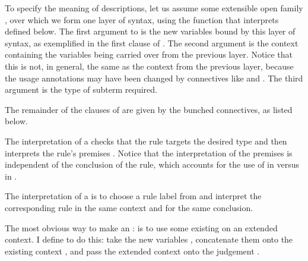 To specify the meaning of descriptions, let us assume some
extensible open family ,
over which we form one layer of syntax, using the function
 that interprets
 defined below.  The first argument to
 is the new variables bound by this layer of syntax, as
exemplified in the first clause of
.  The second argument is
the context containing the variables being carried over from the
previous layer.  Notice that this is not, in general, the same as the
context from the previous layer, because the usage annotations may
have been changed by connectives like
 and
.  The third argument is the
type of subterm required.

The remainder of the clauses of 
are given by the bunched connectives, as listed below.


The interpretation of a  checks that the rule targets
the desired type and then interprets the rule's premises
.  Notice that the interpretation of the premises is
independent of the conclusion of the rule, which accounts for the use
of  in
 versus
 in .


The interpretation of a  is to choose a rule label
 from  and interpret the corresponding rule
\AgdaSpace{} in the same context and for the same
conclusion.


The most obvious way to make an
\AgdaSpace{}\AgdaSymbol:\AgdaSpace{}%
\AgdaSpace{}\AgdaSymbol{\_}
is to use some existing
 on an extended context.
I define  to do this: take the new variables
\AgdaBound{$\Delta$}, concatenate them onto the existing context
\AgdaBound{$\Gamma$}, and pass the extended context onto the judgement
.



